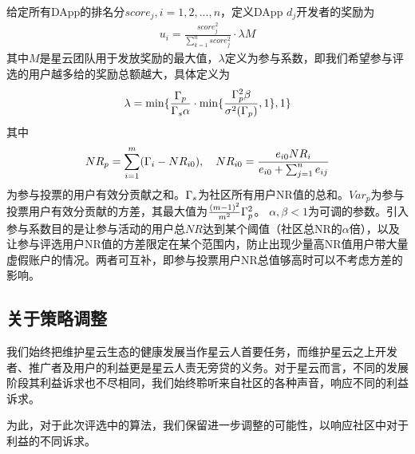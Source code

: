 给定所有DApp的排名分$score_j,i=1,2,...,n$，定义DApp $d_j$开发者的奖励为
\begin{align}
u_i = \frac{score_j^2}{\sum_{k=1}^n score_j^2}\cdot \lambda M
\end{align}
其中$M$是星云团队用于发放奖励的最大值，$\lambda $定义为参与系数，即我们希望参与评选的用户越多给的奖励总额越大，具体定义为
\begin{align}
\lambda=\min\{\frac{\Gamma_p}{\Gamma_s \alpha}\cdot \min\{\frac{\Gamma_p^2 \beta}{\sigma^2(\Gamma_p)},1\},1\}
\end{align}
其中$$NR_p = \sum_{i=1}^m (\Gamma_i-NR_{i0}),~~~NR_{i0} = \frac{e_{i0}NR_i}{e_{i0}+\sum_{j=1}^n {e_{ij}}}$$
为参与投票的用户有效分贡献之和。$\Gamma_s$为社区所有用户NR值的总和。$Var_p$为参与投票用户有效分贡献的方差，其最大值为$\frac{(m-1)^2}{m^2}\Gamma_p^2$。
$\alpha,\beta<1$为可调的参数。引入参与系数目的是让参与活动的用户总$NR$达到某个阈值（社区总NR的$\alpha$倍），以及让参与评选用户NR值的方差限定在某个范围内，防止出现少量高NR值用户带大量虚假账户的情况。两者可互补，即参与投票用户NR总值够高时可以不考虑方差的影响。
\subsection{关于策略调整}
我们始终把维护星云生态的健康发展当作星云人首要任务，而维护星云之上开发者、推广者及用户的利益更是星云人责无旁贷的义务。对于星云而言，不同的发展阶段其利益诉求也不尽相同，我们始终聆听来自社区的各种声音，响应不同的利益诉求。

为此，对于此次评选中的算法，我们保留进一步调整的可能性，以响应社区中对于利益的不同诉求。

